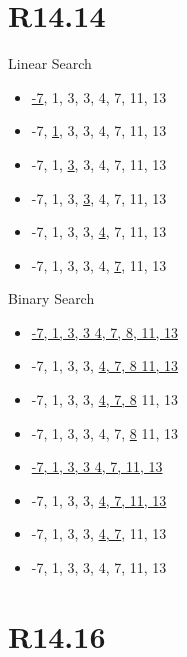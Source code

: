 \documentclass{article}
\begin{document}
\section{R14.14}
\begin{alphalist}
 \item Linear Search
 \begin{itemize}
  \item \underline{-7}, 1, 3, 3, 4, 7, 11, 13
  \item -7, \underline{1}, 3, 3, 4, 7, 11, 13
  \item -7, 1, \underline{3}, 3, 4, 7, 11, 13
  \item -7, 1, 3, \underline{3}, 4, 7, 11, 13
  \item -7, 1, 3, 3, \underline{4}, 7, 11, 13
  \item -7, 1, 3, 3, 4, \underline{7}, 11, 13
 \end{itemize}
 \item Binary Search
 \begin{itemize}
  \item \underline{-7, 1, 3, 3 \hspace{2cm} 4, 7, 8, 11, 13}
  \item -7, 1, 3, 3,\hspace{2cm} \underline{4, 7, 8\hspace{2cm} 11, 13}
  \item  -7, 1, 3, 3,\hspace{2cm} \underline{4, 7,   \hspace{3cm} 8}\hspace{3cm} 11, 13
  \item  -7, 1, 3, 3,\hspace{3cm} 4, 7,\hspace{3cm} \underline{8}\hspace{3cm} 11, 13
 \end{itemize}
 \item
 \begin{itemize}
  \item \underline{-7, 1, 3, 3 \hspace{2cm} 4, 7, 11, 13}
  \item -7, 1, 3, 3,\hspace{2cm} \underline{4, 7,\hspace{2cm} 11, 13}
  \item  -7, 1, 3, 3,\hspace{2cm} \underline{4, 7},\hspace{3cm} 11, 13
  \item  -7, 1, 3, 3,\hspace{3cm} 4, 7,\hspace{3cm} 11, 13
 \end{itemize}
\end{alphalist}
\section{R14.16}
\end{document}
